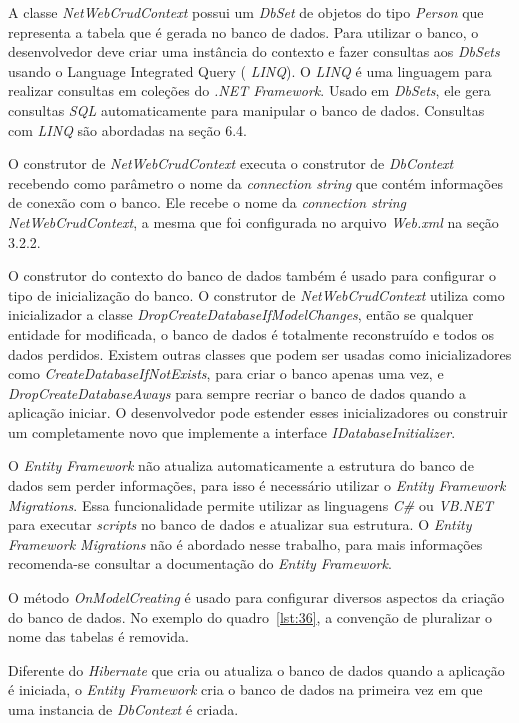 \documentclass[a4paper,12pt]{article}
\newcommand{\est}[1] {
\textit{#1}}
\newcommand{\classe}[1] {
\textit{#1}}
\newcommand{\arquivo}[1] {
\textit{#1}}
\newcommand{\lang}[1] {
\textit{#1}}
\newcommand{\metodo}[1] {
\textit{#1}}
\begin{document}
A classe \classe{NetWebCrudContext} possui um \classe{DbSet} de objetos do tipo \classe{Person} que representa a tabela que é gerada no banco de dados. Para utilizar o banco, o desenvolvedor deve criar uma instância do contexto e fazer consultas aos \classe{DbSets} usando o Language Integrated Query (\lang{LINQ}). O \lang{LINQ} é uma linguagem para realizar consultas em coleções do \est{.NET Framework}. Usado em \classe{DbSets}, ele gera consultas \lang{SQL} automaticamente para manipular o banco de dados. Consultas com \lang{LINQ} são abordadas na seção 6.4.

O construtor de \classe{NetWebCrudContext} executa o construtor de \classe{DbContext} recebendo como parâmetro o nome da \est{connection string} que contém informações de conexão com o banco. Ele recebe o nome da \est{connection string} \est{NetWebCrudContext}, a mesma que foi configurada no arquivo \arquivo{Web.xml} na seção 3.2.2.

O construtor do contexto do banco de dados também é usado para configurar o tipo de inicialização do banco. O construtor de \classe{NetWebCrudContext} utiliza como inicializador a classe \classe{DropCreateDatabaseIfModelChanges}, então se qualquer entidade for modificada, o banco de dados é totalmente reconstruído e todos os dados perdidos. Existem outras classes que podem ser usadas como inicializadores como \classe{CreateDatabaseIfNotExists}, para criar o banco apenas uma vez, e \classe{DropCreateDatabaseAways} para sempre recriar o banco de dados quando a aplicação iniciar. O desenvolvedor pode estender esses inicializadores ou construir um completamente novo que implemente a interface \classe{IDatabaseInitializer}.

O \est{Entity Framework} não atualiza automaticamente a estrutura do banco de dados sem perder informações, para isso é necessário utilizar o \est{Entity Framework Migrations}. Essa funcionalidade permite utilizar as linguagens \lang{C\#} ou \lang{VB.NET} para executar \est{scripts} no banco de dados e atualizar sua estrutura. O \est{Entity Framework Migrations} não é abordado nesse trabalho, para mais informações recomenda-se consultar a documentação do \est{Entity Framework}.

O método \metodo{OnModelCreating} é usado para configurar diversos aspectos da criação do banco de dados.  No exemplo do quadro~\ref{lst:36}, a convenção de pluralizar o nome das tabelas é removida.

Diferente do \est{Hibernate} que cria ou atualiza o banco de dados quando a aplicação é iniciada, o \est{Entity Framework} cria o banco de dados na primeira vez em que uma instancia de \classe{DbContext} é criada.
\end{document}
